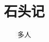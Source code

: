\documentclass[12pt,oneside]{book}
\begin{document}
\title{石头记}
\author{多人}

\makemytitle
\end{document}
